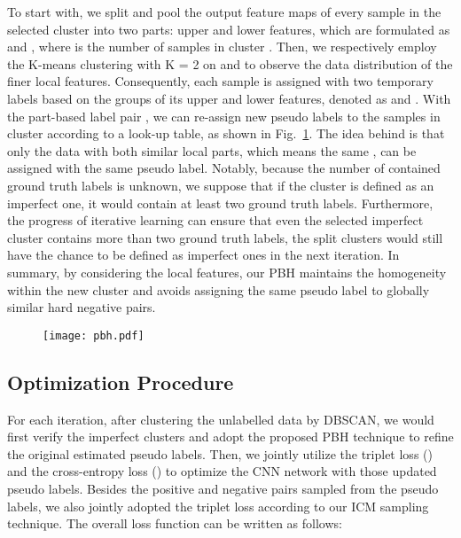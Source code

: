 To start with, we split and pool the output feature maps of every sample in the selected cluster  into two parts: upper and lower features, which are formulated as  and , where  is the number of samples in cluster .
Then, we respectively employ the K-means clustering with K = 2 on  and  to observe the data distribution of the finer local features.
Consequently, each sample is assigned with two temporary labels based on the groups of its upper and lower features, denoted as  and . 
With the part-based label pair , we can re-assign new pseudo labels to the samples in cluster  according to a look-up table, as shown in Fig.~\ref{fig:PBS}.
The idea behind is that only the data with both similar local parts, which means the same , can be assigned with the same pseudo label.
Notably, because the number of contained ground truth labels is unknown, we suppose that if the cluster is defined as an imperfect one, it would contain at least two ground truth labels. Furthermore, the progress of iterative learning can ensure that even the selected imperfect cluster contains more than two ground truth labels, the split clusters would still have the chance to be defined as imperfect ones in the next iteration. 
In summary, by considering the local features, our PBH maintains the homogeneity within the new cluster and avoids assigning the same pseudo label to globally similar hard negative pairs.   
\begin{figure}[t]
	\centering
    \texttt{[image: pbh.pdf]}
    \label{fig:PBS}
    \vspace{-3mm}
\end{figure}

\vspace{-4mm}
\subsection{Optimization Procedure} 
\vspace{-2mm}
\label{sub:optimization}
For each iteration, after clustering the unlabelled data by DBSCAN, we would first verify the imperfect clusters and adopt the proposed PBH technique to refine the original estimated pseudo labels. Then, we jointly utilize the triplet loss () and the cross-entropy loss () to optimize the CNN network with those updated pseudo labels. Besides the positive and negative pairs sampled from the pseudo labels, we also jointly adopted the triplet loss  according to our ICM sampling technique.
The overall loss function can be written as follows:
\vspace{-4mm}

%